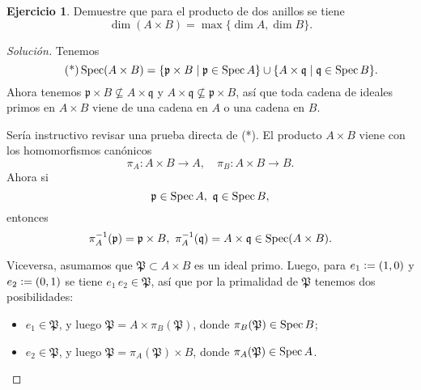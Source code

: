 \documentclass{article}
\theoremstyle{definition}
\newtheorem{ejerc}{Ejercicio}
\newenvironment{solucion}{\begin{proof}[Solución]}{\end{proof}}
\begin{document}
\begin{ejerc}
  Demuestre que para el producto de dos anillos se tiene
  $$\dim (A\times B) = \max \{ \dim A, \dim B \}.$$

  \ifdefined\solutions\begin{solucion}
    Tenemos
    \begin{equation}
      \tag{*} \operatorname{Spec} (A\times B) =
      \{ \mathfrak{p}\times B \mid \mathfrak{p} \in \operatorname{Spec} A \} \cup
      \{ A\times \mathfrak{q} \mid \mathfrak{q} \in \operatorname{Spec} B \}.
    \end{equation}
    Ahora tenemos $\mathfrak{p}\times B \not\subseteq A\times \mathfrak{q}$ y
    $A\times \mathfrak{q} \not\subseteq \mathfrak{p}\times B$, así que toda
    cadena de ideales primos en $A\times B$ viene de una cadena en $A$ o una
    cadena en $B$.

    \vspace{1em}

    Sería instructivo revisar una prueba directa de (*). El producto $A\times B$
    viene con los homomorfismos canónicos
    $$\pi_A\colon A\times B \to A, \quad \pi_B\colon A\times B \to B.$$
    Ahora si
    $$\mathfrak{p} \in \operatorname{Spec} A, ~ \mathfrak{q} \in \operatorname{Spec} B,$$
    entonces
    \[ \pi_A^{-1} (\mathfrak{p}) = \mathfrak{p} \times B, ~
       \pi_A^{-1} (\mathfrak{q}) = A\times \mathfrak{q} \in \operatorname{Spec} (A\times B). \]

    Viceversa, asumamos que $\mathfrak{P} \subset A\times B$ es un ideal
    primo. Luego, para $e_1 \mathrel{\mathop:}= (1,0)$ y $e_2 \mathrel{\mathop:}= (0,1)$ se tiene
    $e_1\,e_2 \in \mathfrak{P}$, así que por la primalidad de $\mathfrak{P}$
    tenemos dos posibilidades:

    \begin{itemize}
    \item $e_1 \in \mathfrak{P}$, y luego
      $\mathfrak{P} = A\times \pi_B (\mathfrak{P})$, donde
      $\pi_B (\mathfrak{P}) \in \operatorname{Spec} B$;

    \item $e_2 \in \mathfrak{P}$, y luego
      $\mathfrak{P} = \pi_A (\mathfrak{P})\times B$, donde
      $\pi_A (\mathfrak{P}) \in \operatorname{Spec} A$. \qedhere
    \end{itemize}
  \end{solucion}\fi
\end{ejerc}
\end{document}
